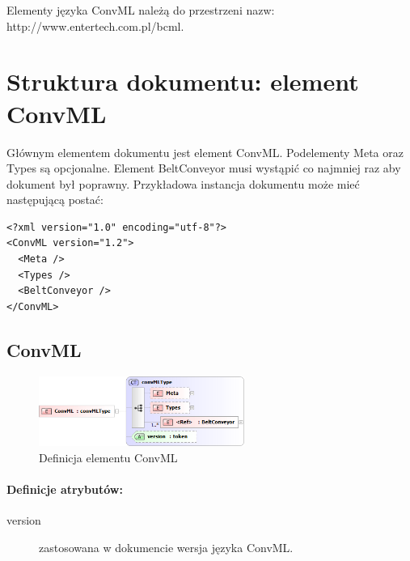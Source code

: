 \documentclass[12pt,a4paper]{article}
\begin{document}
Elementy języka ConvML należą do przestrzeni nazw:
http://www.entertech.com.pl/bcml.

\section{Struktura dokumentu: element ConvML}

Głównym elementem dokumentu jest element ConvML. Podelementy Meta oraz Types są
opcjonalne. Element BeltConveyor musi wystąpić co najmniej raz aby dokument był
poprawny. Przykładowa instancja dokumentu może mieć następującą postać:

\begin{verbatim}
<?xml version="1.0" encoding="utf-8"?>
<ConvML version="1.2">
  <Meta />
  <Types />
  <BeltConveyor />
</ConvML>
\end{verbatim}  

\subsection{ConvML}

\begin{figure}[h]
  \centering
  \includegraphics[width=0.6\textwidth]{png/convml_xsd2}
  \caption{Definicja elementu ConvML}
  \label{fig:convml-xsd}
\end{figure}

\paragraph{Definicje atrybutów:}
\begin{description}
\item[version] zastosowana w dokumencie wersja języka ConvML.
\end{description}
\end{document}
